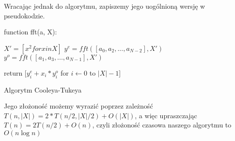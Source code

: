 Wracając jednak do algorytmu, zapiszemy jego uogólnioną wersję w pseudokodzie.\\
\begin{algorithm}[H]
  \DontPrintSemicolon


  function fft(a, X):

  $X' = [x^2 for x in X]$
  $y^e = fft([a_0, a_2, ..., a_{N - 2}], X')$
  $y^o = fft([a_1, a_3, ..., a_{N - 1}], X')$

  return [$y_i^e + x_i*y_i^o$ for $i \leftarrow 0$ to $|X| - 1$]

  \caption{Algorytm Cooleya-Tukeya}
  \label{alg-fft-cooley-tukey}
\end{algorithm}
Jego złożoność możemy wyrazić poprzez zależność $T(n, |X|) = 2*T(n/2, |X|/2) + O(|X|)$, a więc upraszczając $T(n) = 2T(n/2) + O(n)$, czyli złożoność czasowa naszego algorytmu to $O(n\log{n})$
